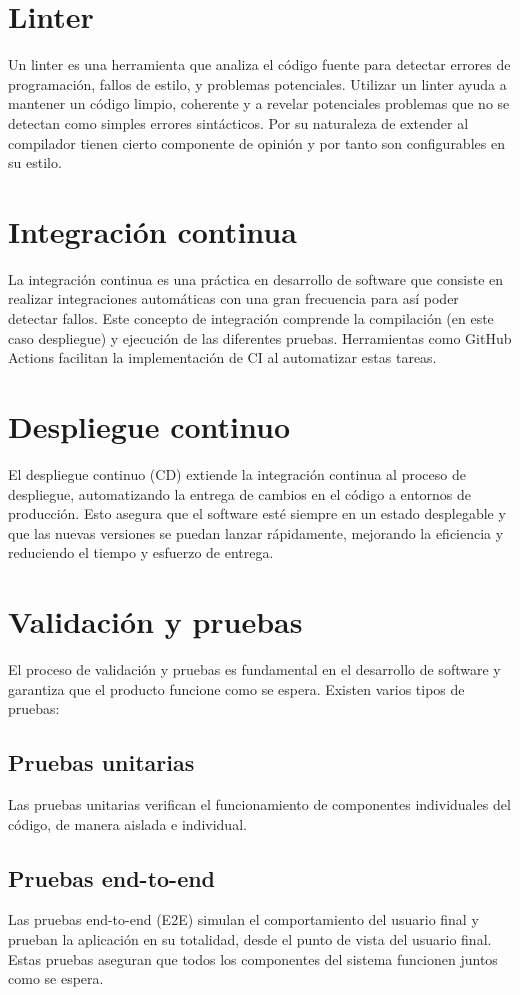 \section{Linter}
Un linter es una herramienta que analiza el código fuente para detectar errores de programación, fallos de estilo, y problemas potenciales. Utilizar un linter ayuda a mantener un código limpio, coherente y a revelar potenciales problemas que no se detectan como simples errores sintácticos. Por su naturaleza de extender al compilador tienen cierto componente de opinión y por tanto son configurables en su estilo.

\section{Integración continua}
La integración continua es una práctica en desarrollo de software que consiste en realizar integraciones automáticas con una gran frecuencia para así poder detectar fallos. Este concepto de integración comprende la compilación (en este caso despliegue) y ejecución de las diferentes pruebas. Herramientas como GitHub Actions facilitan la implementación de CI al automatizar estas tareas.

\section{Despliegue continuo}
El despliegue continuo (CD) extiende la integración continua al proceso de despliegue, automatizando la entrega de cambios en el código a entornos de producción. Esto asegura que el software esté siempre en un estado desplegable y que las nuevas versiones se puedan lanzar rápidamente, mejorando la eficiencia y reduciendo el tiempo y esfuerzo de entrega.


\section{Validación y pruebas}
El proceso de validación y pruebas es fundamental en el desarrollo de software y garantiza que el producto funcione como se espera. Existen varios tipos de pruebas:

\subsection{Pruebas unitarias}
Las pruebas unitarias verifican el funcionamiento de componentes individuales del código, de manera aislada e individual.

\subsection{Pruebas end-to-end}
Las pruebas end-to-end (E2E) simulan el comportamiento del usuario final y prueban la aplicación en su totalidad, desde el punto de vista del usuario final. Estas pruebas aseguran que todos los componentes del sistema funcionen juntos como se espera.